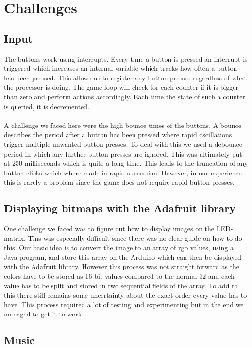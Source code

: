 \documentclass[12pt, a4paper]{article}
\begin{document}
\section*{Challenges}
\label{sec:challenges}

\subsection*{Input}
The buttons work using interrupts. Every time a button is pressed an interrupt is triggered which increases an internal variable which tracks how often a button has been pressed. This allows us to register any button presses regardless of what the processor is doing. The game loop will check for each counter if it is bigger than zero and perform actions accordingly. Each time the state of such a counter is queried, it is decremented. \\\\
A challenge we faced here were the high bounce times of the buttons. A bounce describes the period after a button has been pressed where rapid oscillations trigger multiple unwanted button presses. To deal with this we used a debounce period in which any further button presses are ignored. This was ultimately put at 250 milliseconds which is quite a long time. This leads to the truncation of any button clicks which where made in rapid succession. However, in our experience this is rarely a problem since the game does not require rapid button presses. 

\subsection*{Displaying bitmaps with the Adafruit library}
One challenge we faced was to figure out how to display images on the LED-matrix. This was especially difficult since there was no clear guide on how to do this. Our basic idea is to convert the image to an array of rgb values, using a Java program, and store this array on the Arduino which can then be displayed with the Adafruit library. However this process was not straight forward as the colors have to be stored as 16-bit values compared to the normal 32 and each value has to be split and stored in two sequential fields of the array. To add to this there still remains some uncertainty about the exact order every value has to have. This process required a lot of testing and experimenting but in the end we managed to get it to work. 

\subsection*{Music}
\end{document}
